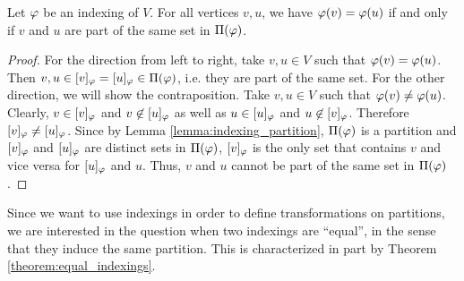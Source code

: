 \begin{samepage}
    \begin{lemmarep}
        Let $\varphi$ be an indexing of $V$. For all vertices $v,u$, we have $\varphi(v) = \varphi(u)$ if and only if $v$ and $u$ are part of the same set in $\Pi(\varphi)$. \label{lemma:indexing_same_set}
    \end{lemmarep}
\end{samepage}
\begin{proof}
    For the direction from left to right, take $v,u\in V$ such that $\varphi(v)=\varphi(u)$. Then $v,u \in [v]_\varphi = [u]_\varphi \in \Pi(\varphi)$, i.e. they are part of the same set. For the other direction, we will show the contraposition. Take $v,u\in V$ such that $\varphi(v)\neq \varphi(u)$. Clearly, $v \in [v]_\varphi$ and $v \not\in [u]_\varphi$ as well as $u \in [u]_\varphi$ and $u \not\in [v]_\varphi$. Therefore $[v]_\varphi \neq [u]_\varphi$. Since by Lemma \ref{lemma:indexing_partition}, $\Pi(\varphi)$ is a partition and $[v]_\varphi$ and $[u]_\varphi$ are distinct sets in $\Pi(\varphi)$, $[v]_\varphi$ is the only set that contains $v$ and vice versa for $[u]_\varphi$ and $u$. Thus, $v$ and $u$ cannot be part of the same set in $\Pi(\varphi)$. 
\end{proof}

Since we want to use indexings in order to define transformations on partitions, we are interested in the question when two indexings are ``equal'', in the sense that they induce the same partition. This is characterized in part by Theorem \ref{theorem:equal_indexings}.

